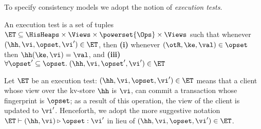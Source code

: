 To specify consistency models we adopt the notion of \emph{execution tests}. 
\begin{definition}
\label{def:execution.test}
An execution test is a set of tuples $\ET \subseteq \HisHeaps \times \Views \times \powerset{\Ops} \times \Views$ 
such that whenever $(\hh, \vi, \opset, \vi') \in \ET$, then 
\textbf{(i)} whenever $(\otR, \ke, \val) \in \opset$ then $\hh(\ke, \vi) = \val$, 
and \textbf{(iii)} $\forall \opset' \subseteq \opset.\; (\hh, \vi, \opset', \vi') \in \ET$
\end{definition}
Let $\ET$ be an execution test: $(\hh, \vi, \opset, \vi') \in \ET$ means 
that a client whose view over the kv-store $\hh$ is $\vi$, can commit a 
transaction whose fingerprint is $\opset$; as a result of this operation, the 
view of the client is updated to $\vi'$. Henceforth, we adopt the 
more suggestive notation $\ET \vdash (\hh, \vi) \triangleright \opset: \vi'$ 
in lieu of $(\hh, \vi, \opset, \vi') \in \ET$.
